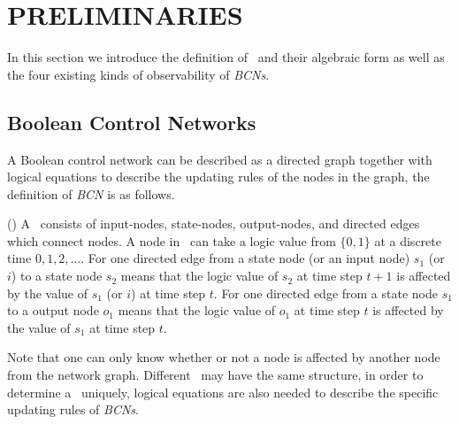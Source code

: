 \section{PRELIMINARIES}
In this section we introduce the definition of \BCNs\ and their algebraic form as well as the four existing kinds of observability of {\em BCNs}.



\subsection{Boolean Control Networks}

A Boolean control network can be described as a directed graph together with logical equations to describe the updating rules of the nodes in the graph, the definition of {\em BCN} is as follows. 

\begin{definition}
(\cite{Ideker2001A}) A \BCN\ consists of input-nodes, state-nodes, output-nodes, and directed edges which connect nodes. A node in \BCN\ can take a logic value from $\{0,1\}$ at a discrete time $0, 1, 2,\ldots$. For one directed edge from a state node (or an input node) $s_1$ (or $i$) to a state node $s_2$ means that the logic value of $s_2$ at time step $t+1$ is affected by the value of $s_1$ (or $i$)  at time step $t$. For one directed edge from a state node $s_1$ to a output node $o_1$ means that the logic value of $o_1$ at time step $t$ is affected by the value of $s_1$  at time step $t$. 
\end{definition}


Note that one can only know whether or not a node is affected by another node from the network graph. Different \BCNs\ may have the same structure, in order to determine a \BCN\ uniquely, logical equations are also needed to describe the specific updating rules of {\em BCNs}.

